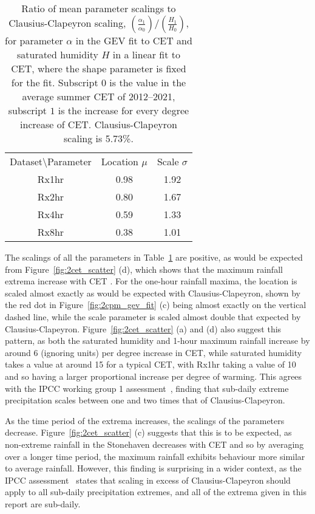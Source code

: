 \begin{table}[H]
    \centering
    \begin{tabular}{c c c}
        Dataset\textbackslash Parameter  & Location $\mu$ & Scale $\sigma$ \\
        Rx1hr &0.98&1.92 \\
        Rx2hr &0.80&1.67 \\
        Rx4hr &0.59&1.33 \\
        Rx8hr &0.38&1.01 \\
    \end{tabular}
    \caption[Ratio of mean parameter scalings to Clausius-Clapeyron scaling.]{
        Ratio of mean parameter scalings to Clausius-Clapeyron scaling, $\left( \frac{\alpha_1}{\alpha_0} \right) / \left( \frac{H_1}{H_0} \right)$,
        for parameter $\alpha$ in the GEV fit to CET and saturated humidity $H$ in a linear fit to CET,
        where the shape parameter is fixed for the fit.
        Subscript $0$ is the value in the average summer CET of 2012--2021,
            subscript $1$ is the increase for every degree increase of CET.
    Clausius-Clapeyron scaling is 5.73\%.}
    \label{tab:CCtable}
\end{table}

The scalings of all the parameters in Table~\ref{tab:CCtable} are positive,
    as would be expected from Figure~\ref{fig:2cet_scatter} (d),
    which shows that the maximum rainfall extrema increase with CET .
For the one-hour rainfall maxima,
    the location is scaled almost exactly as would be expected with Clausius-Clapeyron,
    shown by the red dot in Figure~\ref{fig:2cpm_gev_fit} (c) being almost exactly on the vertical dashed line,
    while the scale parameter is scaled almost double that expected by Clausius-Clapeyron.
Figure~\ref{fig:2cet_scatter} (a) and (d) also suggest this pattern,
    as both the saturated humidity and 1-hour maximum rainfall increase by around 6 (ignoring units)
    per degree increase in CET, while saturated humidity takes a value at around 15 for a typical CET,
    with Rx1hr taking a value of 10 and so having a larger proportional increase per degree of warming.
This agrees with the IPCC working group 1 assessment~\cite{IPCC_2021},
    finding that sub-daily extreme precipitation scales between one and two times that of Clausius-Clapeyron.

As the time period of the extrema increases,
    the scalings of the parameters decrease.
Figure~\ref{fig:2cet_scatter} (c) suggests that this is to be expected,
    as non-extreme rainfall in the Stonehaven decreases with CET and so by averaging over a longer time period,
    the maximum rainfall exhibits behaviour more similar to average rainfall.
However, this finding is surprising in a wider context,
    as the IPCC assessment~\cite{IPCC_2021} states that scaling in excess of Clausius-Clapeyron should apply to all sub-daily precipitation extremes,
    and all of the extrema given in this report are sub-daily.

